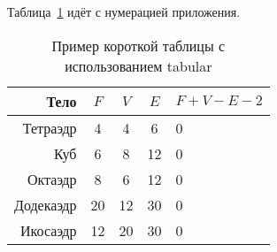 
Таблица~\ref{tab:b1} идёт с нумерацией приложения.

\begin{table}    
    \caption{Пример короткой таблицы с использованием tabular}
    \begin{tabular}{|r|c|c|c|l|}\hline
    Тело      & $F$ & $V$  & $E$ & $F+V-E-2$ \\ \hline
    Тетраэдр  & 4   & 4    & 6   & 0         \\ \hhline{~-~-~}
    Куб       & 6   & 8    & 12  & 0         \\ \hhline{--~~~}
    Октаэдр   & 8   & 6    & 12  & 0         \\ \hhline{-----}
    Додекаэдр & 20  & 12   & 30  & 0         \\ \hline
    Икосаэдр  & 12  & 20   & 30  & 0         \\ \hline
    \end{tabular}
    \label{tab:b1}
\end{table}
